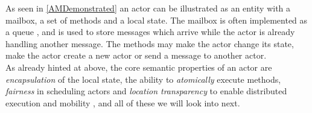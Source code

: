 As seen in \autoref{AMDemonstrated} an actor can be illustrated as an entity with a mailbox, a set of methods and a local state. The mailbox is often implemented as a queue \cite{ActorModelPaper}, and is used to store messages which arrive while the actor is already handling another message. The methods may make the actor change its state, make the actor create a new actor or send a message to another actor.\\
As already hinted at above, the core semantic properties of an actor are \textit{encapsulation} of the local state, the ability to \textit{atomically} execute methods, \textit{fairness} in scheduling actors and \textit{location transparency} to enable distributed execution and mobility \cite{ActorModelPaper}, and all of these we will look into next.
 

